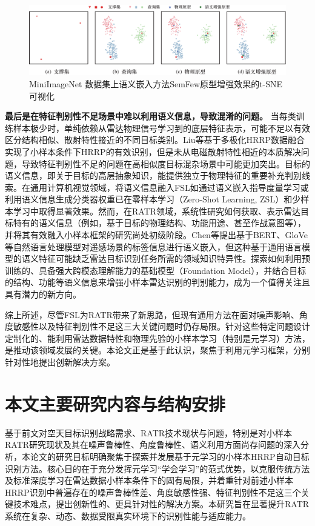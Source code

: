 \begin{figure}[h!]
    \centering
    \includegraphics[width=\linewidth]{figures/yuyi.pdf}
    \caption{MiniImageNet 数据集上语义嵌入方法SemFew原型增强效果的t-SNE可视化}
    \label{fig:yuyi}
\end{figure}

\textbf{最后是在特征判别性不足场景中难以利用语义信息，导致混淆的问题。}
当每类训练样本极少时，单纯依赖从雷达物理信号学习到的底层特征表示，可能不足以有效区分结构相似、散射特性接近的不同目标类别。Liu等基于多极化HRRP数据融合实现了小样本条件下HRRP的有效识别，但是未从电磁散射特性相近的本质解决问题，导致特征判别性不足的问题在高相似度目标混杂场景中可能更加突出。目标的语义信息，即关于目标的高层抽象知识，能提供独立于物理特征的重要补充判别线索。在通用计算机视觉领域，将语义信息融入FSL如通过语义嵌入指导度量学习或利用语义信息生成分类器权重已在零样本学习（Zero-Shot Learning, ZSL）和少样本学习中取得显著效果。然而，在RATR领域，系统性研究如何获取、表示雷达目标特有的语义信息（例如，基于目标的物理结构、功能用途、甚至作战意图等），并将其有效融入小样本框架的研究尚处初级阶段。Chen等提出基于BERT、GloVe等自然语言处理模型对遥感场景的标签信息进行语义嵌入，但这种基于通用语言模型的语义特征可能缺乏雷达目标识别任务所需的领域知识特异性。探索如何利用预训练的、具备强大跨模态理解能力的基础模型（Foundation Model），并结合目标的结构、功能等语义信息来增强小样本雷达识别的判别能力，成为一个值得关注且具有潜力的新方向。

综上所述，尽管FSL为RATR带来了新思路，但现有通用方法在面对噪声影响、角度敏感性以及特征判别性不足这三大关键问题时仍存局限。针对这些特定问题设计定制化的、能利用雷达数据特性和物理先验的小样本学习（特别是元学习）方法，是推动该领域发展的关键。本论文正是基于此认识，聚焦于利用元学习框架，分别针对性地提出创新解决方案。

\section{本文主要研究内容与结构安排}
\label{sec:structure} %
基于前文对空天目标识别战略需求、RATR技术现状与问题，特别是对小样本RATR研究现状及其在噪声鲁棒性、角度鲁棒性、语义利用方面尚存问题的深入分析，本论文的研究目标明确聚焦于探索并发展基于元学习的小样本HRRP自动目标识别方法。核心目的在于充分发挥元学习“学会学习”的范式优势，以克服传统方法及标准深度学习在雷达数据小样本条件下的固有局限，并着重针对前述小样本HRRP识别中普遍存在的噪声鲁棒性差、角度敏感性强、特征判别性不足这三个关键技术难点，提出创新性的、更具针对性的解决方案。本研究旨在显著提升RATR系统在复杂、动态、数据受限真实环境下的识别性能与适应能力。

